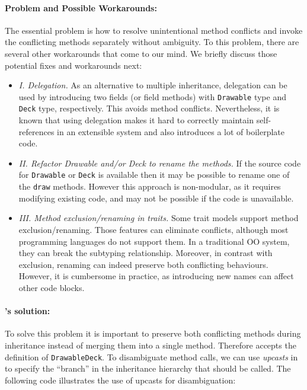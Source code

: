 \paragraph{Problem and Possible Workarounds:} The essential problem is
how to resolve unintentional method conflicts and invoke the
conflicting methods separately without ambiguity. To this problem, there are several other workarounds
that come to our mind. We briefly discuss those potential fixes and
workarounds next:
\begin{itemize}
  \item \textit{I. Delegation.} As an alternative to multiple inheritance,
  delegation can be used by introducing two fields (or field methods) with
  \lstinline|Drawable| type and \lstinline|Deck| type,
  respectively. This avoids method conflicts. Nevertheless, it is known
  that using delegation makes it hard to correctly maintain
  self-references in an extensible system and also
  introduces a lot of boilerplate code.
  \item \textit{II. Refactor Drawable and/or Deck to rename the methods.} If
  the source code for \lstinline|Drawable| or \lstinline|Deck| is available
  then it may be possible to rename one of the \lstinline|draw|
  methods. However this approach is non-modular, as it requires 
  modifying existing code, and may not be possible if the code is unavailable.
  \item \textit{III. Method exclusion/renaming in traits.} Some trait models
  support method exclusion/renaming. Those features
   can eliminate conflicts, although most
  programming languages do not support them. In a traditional OO system,
  they can break the subtyping relationship. Moreover, in
  contrast with exclusion, renaming can indeed preserve both conflicting
  behaviours. However, it is cumbersome in practice, as introducing new
  names can affect other code blocks.
\end{itemize}


\paragraph{\MIM{}'s solution:} To solve this problem it is important to preserve both conflicting methods
during inheritance instead of merging them into a single
method. Therefore \MIM{} accepts the definition of
\lstinline|DrawableDeck|. To disambiguate method calls, 
we can use \emph{upcasts} in \MIM{} to specify the ``branch'' in the
inheritance hierarchy that should be called. The following code
illustrates the use of upcasts for disambiguation:


